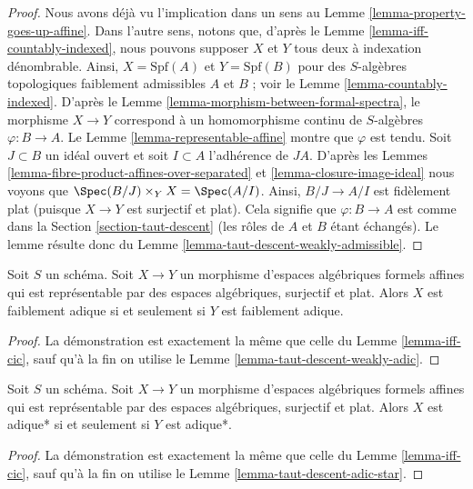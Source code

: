 \begin{proof}
Nous avons déjà vu l'implication dans un sens au
Lemme \ref{lemma-property-goes-up-affine}. Dans l'autre sens,
notons que, d'après le Lemme \ref{lemma-iff-countably-indexed}, nous pouvons supposer
$X$ et $Y$ tous deux à indexation dénombrable. Ainsi, $X = \text{Spf}(A)$
et $Y = \text{Spf}(B)$ pour des $S$-algèbres topologiques faiblement
admissibles $A$ et $B$ ; voir le Lemme \ref{lemma-countably-indexed}.
D'après le Lemme \ref{lemma-morphism-between-formal-spectra},
le morphisme $X \to Y$ correspond à un homomorphisme continu de $S$-algèbres
$\varphi : B \to A$. Le
Lemme \ref{lemma-representable-affine} montre que $\varphi$ est tendu.
Soit $J \subset B$ un idéal ouvert et soit $I \subset A$
l'adhérence de $JA$. D'après les
Lemmes \ref{lemma-fibre-product-affines-over-separated} et
\ref{lemma-closure-image-ideal}
nous voyons que $\Spec(B/J) \times_Y X = \Spec(A/I)$.
Ainsi, $B/J \to A/I$ est fidèlement plat (puisque $X \to Y$ est surjectif
et plat). Cela signifie que $\varphi : B \to A$ est comme dans la
Section \ref{section-taut-descent} (les rôles de $A$ et $B$ étant échangés).
Le lemme résulte donc du
Lemme \ref{lemma-taut-descent-weakly-admissible}.
\end{proof}

\begin{lemma}
\label{lemma-iff-weakly-adic}
Soit $S$ un schéma. Soit $X \to Y$ un morphisme d'espaces algébriques
formels affines qui est représentable par des espaces algébriques,
surjectif et plat. Alors $X$ est faiblement adique
si et seulement si $Y$ est faiblement adique.
\end{lemma}

\begin{proof}
La démonstration est exactement la même que celle du
Lemme \ref{lemma-iff-cic}, sauf qu'à la fin on utilise le
Lemme \ref{lemma-taut-descent-weakly-adic}.
\end{proof}

\begin{lemma}
\label{lemma-iff-adic-star}
Soit $S$ un schéma. Soit $X \to Y$ un morphisme d'espaces algébriques
formels affines qui est représentable par des espaces algébriques,
surjectif et plat. Alors $X$ est adique* si et seulement si $Y$ est adique*.
\end{lemma}

\begin{proof}
La démonstration est exactement la même que celle du
Lemme \ref{lemma-iff-cic}, sauf qu'à la fin on utilise le
Lemme \ref{lemma-taut-descent-adic-star}.
\end{proof}

